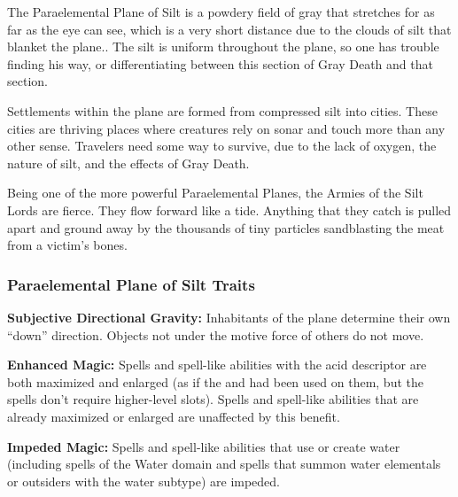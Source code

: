 The Paraelemental Plane of Silt is a powdery field of gray that stretches for as far as the eye can see, which is a very short distance due to the clouds of silt that blanket the plane.. The silt is uniform throughout the plane, so one has trouble finding his way, or differentiating between this section of Gray Death and that section.

Settlements within the plane are formed from compressed silt into cities. These cities are thriving places where creatures rely on sonar and touch more than any other sense. Travelers need some way to survive, due to the lack of oxygen, the nature of silt, and the effects of Gray Death.

Being one of the more powerful Paraelemental Planes, the Armies of the Silt Lords are fierce. They flow forward like a tide. Anything that they catch is pulled apart and ground away by the thousands of tiny particles sandblasting the meat from a victim's bones.

\subsubsection{Paraelemental Plane of Silt Traits}
\begin{itemize*}
\item \textbf{Subjective Directional Gravity:} Inhabitants of the plane determine their own ``down'' direction. Objects not under the motive force of others do not move.
\item \textbf{Enhanced Magic:} Spells and spell-like abilities with the acid descriptor are both maximized and enlarged (as if the  and  had been used on them, but the spells don't require higher-level slots). Spells and spell-like abilities that are already maximized or enlarged are unaffected by this benefit.
\item \textbf{Impeded Magic:} Spells and spell-like abilities that use or create water (including spells of the Water domain and spells that summon water elementals or outsiders with the water subtype) are impeded.
\end{itemize*}
